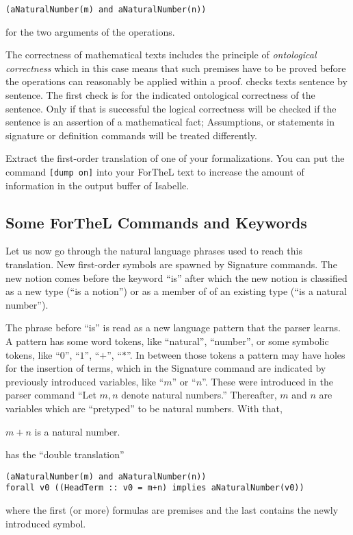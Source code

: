 \documentclass{stex}
\begin{document}
\verb+(aNaturalNumber(m) and aNaturalNumber(n))+

\noindent for the two arguments of the operations.

The correctness of mathematical texts includes the principle of
\textit{ontological correctness} which in this case means that
such premises have to
be proved before the operations can reasonably be applied within
a proof. \Naproche{} checks texts sentence by sentence.
The first check is for the indicated ontological correctness
of the sentence. Only if that is successful the logical correctness
will be checked if the sentence is an assertion of a mathematical fact;
Assumptions, or statements in signature or definition commands will
be treated differently.

\begin{exercise}
Extract the first-order translation of one of your formalizations.
You can put the command \verb+[dump on]+ into your ForTheL text
to increase the amount
of information in the output buffer of Isabelle.
\end{exercise}

\subsection{Some ForTheL Commands and Keywords}

Let us now go through the natural language phrases used to
reach this translation. New first-order symbols are spawned by
Signature commands. The new notion comes before the keyword ``is''
after which the new notion is classified as a new type (``is a notion'')
or as a member of of an existing type (``is a natural number'').

The phrase before ``is'' is read as a new language pattern that
the parser learns. A pattern has some word tokens,
like ``natural'',
``number'', or some symbolic tokens, like
``$0$'', ``$1$'', ``$+$'', ``$*$''.
In between those tokens a pattern may have holes for the insertion
of terms, which in the Signature command are indicated by previously
introduced variables, like ``$m$'' or ``$n$''. These were introduced in
the parser command ``Let $m,n$ denote natural numbers.''
Thereafter, $m$ and $n$ are variables which are ``pretyped'' to be
natural numbers. With that,
\begin{signature} $m + n$ is a natural number.
\end{signature}
has the ``double translation''
\begin{verbatim}
(aNaturalNumber(m) and aNaturalNumber(n))
forall v0 ((HeadTerm :: v0 = m+n) implies aNaturalNumber(v0))
\end{verbatim}
where the first (or more) formulas are premises and the last contains the
newly introduced symbol.
\end{document}
